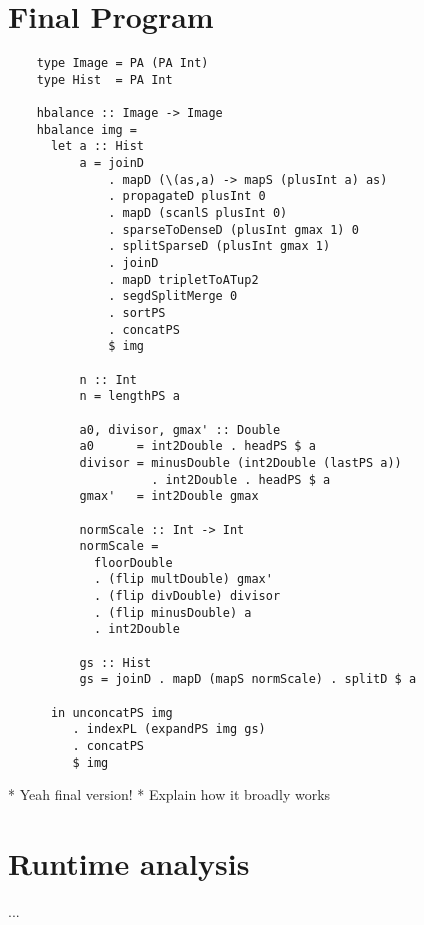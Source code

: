   \section{Final Program}
    \begin{lstlisting}
    type Image = PA (PA Int)
    type Hist  = PA Int

    hbalance :: Image -> Image
    hbalance img =
      let a :: Hist
          a = joinD
              . mapD (\(as,a) -> mapS (plusInt a) as)
              . propagateD plusInt 0
              . mapD (scanlS plusInt 0)
              . sparseToDenseD (plusInt gmax 1) 0
              . splitSparseD (plusInt gmax 1)
              . joinD
              . mapD tripletToATup2
              . segdSplitMerge 0
              . sortPS
              . concatPS
              $ img
                  
          n :: Int
          n = lengthPS a
          
          a0, divisor, gmax' :: Double
          a0      = int2Double . headPS $ a
          divisor = minusDouble (int2Double (lastPS a))
                    . int2Double . headPS $ a
          gmax'   = int2Double gmax
          
          normScale :: Int -> Int
          normScale = 
            floorDouble
            . (flip multDouble) gmax'
            . (flip divDouble) divisor
            . (flip minusDouble) a
            . int2Double
            
          gs :: Hist
          gs = joinD . mapD (mapS normScale) . splitD $ a
          
      in unconcatPS img
         . indexPL (expandPS img gs)
         . concatPS
         $ img
    \end{lstlisting}
    * Yeah final version!
    * Explain how it broadly works
    
  \section{Runtime analysis}
    ...
    
    

